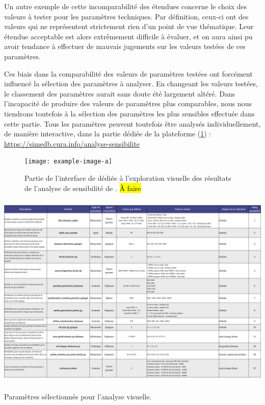 Un autre exemple de cette incomparabilité des étendues concerne le choix des valeurs à tester pour les paramètres techniques.
Par définition, ceux-ci ont des valeurs qui ne représentent strictement rien d'un point de vue thématique.
Leur étendue acceptable est alors extrêmement difficile à évaluer, et on aura ainsi pu avoir tendance à effectuer de mauvais jugements sur les valeurs testées de ces paramètres.

Ces biais dans la comparabilité des valeurs de paramètres testées ont forcément influencé la sélection des paramètres à analyser.
En changeant les valeurs testées, le classement des paramètres aurait sans doute été largement altéré.
Dans l'incapacité de produire des valeurs de paramètres plus comparables, nous nous tiendrons toutefois à la sélection des paramètres \og les plus sensibles\fg{} effectuée dans cette partie.
Tous les paramètres peuvent toutefois être analysés individuellement, de manière interactive, dans la partie dédiée de la plateforme \simedb{} (\cref{fig:screenshot-simedb-sensib}) : \href{https://simedb.cura.info/analyse-sensibilite}{https://simedb.cura.info/analyse-sensibilite}

\begin{figure}[H]
	\centering
	\texttt{[image: example-image-a]}
	\caption[Partie de l'interface de \simedb{} dédiée à l'exploration visuelle des résultats de l'analyse de sensibilité de \simfeodal{}.]{Partie de l'interface de \simedb{} dédiée à l'exploration visuelle des résultats de l'analyse de sensibilité de \simfeodal{}. \hl{À faire}}
	\label{fig:screenshot-simedb-sensib}
\end{figure}

\clearpage
\begin{table}[H]\vspace*{-1em}
\centering
\includegraphics[width=\textheight, angle=90, origin=c]{img/Parametres.pdf}
\caption{Paramètres sélectionnés pour l'analyse visuelle.}
\label{tab:selection-parametres-anavis}
\end{table}

